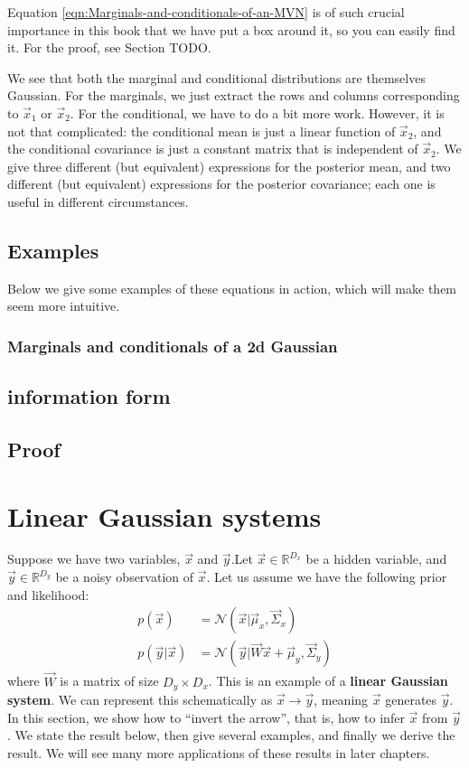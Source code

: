 Equation \ref{eqn:Marginals-and-conditionals-of-an-MVN} is of such crucial importance in this book that we have put a box around it, so you can easily find it. For the proof, see Section TODO.

We see that both the marginal and conditional distributions are themselves Gaussian. For the marginals, we just extract the rows and columns corresponding to $\vec{x}_1$ or $\vec{x}_2$. For the conditional, we have to do a bit more work. However, it is not that complicated: the conditional mean is just a linear function of $\vec{x}_2$, and the conditional covariance is just a constant matrix that is independent of $\vec{x}_2$. We give three different (but equivalent) expressions for the posterior mean, and two different (but equivalent) expressions for the posterior covariance; each one is useful in different circumstances.


\subsection{Examples}
Below we give some examples of these equations in action, which will make them seem more intuitive.


\subsubsection{Marginals and conditionals of a 2d Gaussian}

\subsection{information form}

\subsection{Proof}

\section{Linear Gaussian systems}
Suppose we have two variables, $\vec{x}$ and $\vec{y}$.Let $\vec{x} \in \mathbb{R}^{D_x}$ be a hidden variable, and $\vec{y} \in \mathbb{R}^{D_y}$ be a noisy observation of $\vec{x}$. Let us assume we have the following prior and likelihood:
\begin{equation}\label{eqn:Linear-Gaussian-system}
  \boxed{\begin{split}
    p(\vec{x})&=\mathcal{N}(\vec{x}|\vec{\mu}_x,\vec{\Sigma}_x) \\
	p(\vec{y}|\vec{x})&=\mathcal{N}(\vec{y}|\vec{W}\vec{x}+\vec{\mu}_y,\vec{\Sigma}_y)
  \end{split}}
\end{equation}
where $\vec{W}$ is a matrix of size $D_y \times D_x$. This is an example of a \textbf{linear Gaussian system}. We can represent this schematically as $\vec{x} \rightarrow \vec{y}$, meaning $\vec{x}$ generates $\vec{y}$. In this section, we show how to “invert the arrow”, that is, how to infer $\vec{x}$ from $\vec{y}$. We state the result below, then give several examples, and finally we derive the result. We will see many more applications of these results in later chapters.


